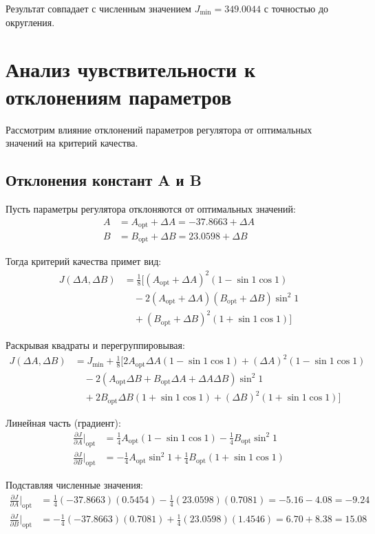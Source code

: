 Результат совпадает с численным значением \(J_{\min} = 349.0044\) с точностью до округления.

\section{Анализ чувствительности к отклонениям параметров}
Рассмотрим влияние отклонений параметров регулятора от оптимальных значений на критерий качества.

\subsection{Отклонения констант A и B}
Пусть параметры регулятора отклоняются от оптимальных значений:
\begin{align}
A &= A_{\text{opt}} + \Delta A = -37.8663 + \Delta A \\
B &= B_{\text{opt}} + \Delta B = 23.0598 + \Delta B
\end{align}

Тогда критерий качества примет вид:
\begin{align}
J(\Delta A, \Delta B) &= \tfrac{1}{8}\big[(A_{\text{opt}} + \Delta A)^2(1-\sin 1\cos 1) \\
&\quad - 2(A_{\text{opt}} + \Delta A)(B_{\text{opt}} + \Delta B)\sin^2 1 \\
&\quad + (B_{\text{opt}} + \Delta B)^2(1+\sin 1\cos 1)\big]
\end{align}

Раскрывая квадраты и перегруппировывая:
\begin{align}
J(\Delta A, \Delta B) &= J_{\min} + \tfrac{1}{8}\big[2A_{\text{opt}}\Delta A(1-\sin 1\cos 1) + (\Delta A)^2(1-\sin 1\cos 1) \\
&\quad - 2(A_{\text{opt}}\Delta B + B_{\text{opt}}\Delta A + \Delta A\Delta B)\sin^2 1 \\
&\quad + 2B_{\text{opt}}\Delta B(1+\sin 1\cos 1) + (\Delta B)^2(1+\sin 1\cos 1)\big]
\end{align}

Линейная часть (градиент):
\begin{align}
\frac{\partial J}{\partial A}\Big|_{\text{opt}} &= \tfrac{1}{4}A_{\text{opt}}(1-\sin 1\cos 1) - \tfrac{1}{4}B_{\text{opt}}\sin^2 1 \\
\frac{\partial J}{\partial B}\Big|_{\text{opt}} &= -\tfrac{1}{4}A_{\text{opt}}\sin^2 1 + \tfrac{1}{4}B_{\text{opt}}(1+\sin 1\cos 1)
\end{align}

Подставляя численные значения:
\begin{align}
\frac{\partial J}{\partial A}\Big|_{\text{opt}} &= \tfrac{1}{4}(-37.8663)(0.5454) - \tfrac{1}{4}(23.0598)(0.7081) = -5.16 - 4.08 = -9.24 \\
\frac{\partial J}{\partial B}\Big|_{\text{opt}} &= -\tfrac{1}{4}(-37.8663)(0.7081) + \tfrac{1}{4}(23.0598)(1.4546) = 6.70 + 8.38 = 15.08
\end{align}

